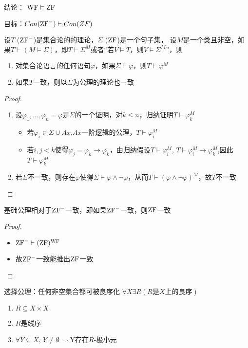 \documentclass[11pt]{article}
\begin{document}
结论： \(\operatorname{WF}\vDash\operatorname{ZF}\)


目标：\(Con(\text{ZF}^-)\vdash Con(ZF)\)

\begin{theorem}[]
设\(T\) (\(\text{ZF}^-\))是集合论的的理论，\(\Sigma\) (\(\operatorname{ZF}\))是一个句子集， 设\(M\)是一个类且非空，如
果\(T\vdash(M\vDash\Sigma)\)，即\(T\vdash\Sigma^M\)或者“若\(V\vDash T\)，则\(V\vDash\Sigma^M\)”，则
\begin{enumerate}
\item 对集合论语言的任何语句\(\varphi\)，如果\(\Sigma\vdash\varphi\)，则\(T\vdash\varphi^M\)
\item 如果\(T\)一致，则以\(\Sigma\)为公理的理论也一致
\end{enumerate}
\end{theorem}

\begin{proof}
\begin{enumerate}
\item 设\(\varphi_1,\dots,\varphi_n=\varphi\)是\(\Sigma\)的一个证明，对\(k\le n\)，归纳证明\(T\vdash\varphi_k^M\)
\begin{itemize}
\item 若\(\varphi_i\in\Sigma\cup Ax\),\(Ax\)一阶逻辑的公理，\(T\vdash\varphi_i^M\)
\item 若\(i,j<k\)使得\(\varphi_j=\varphi_k\to\varphi_k\)，由归纳假设\(T\vdash\varphi_i^M\), \(T\vdash\varphi_i^M\to\varphi_k^M\),因此\(T\vdash\varphi_k^M\)
\end{itemize}
\item 若\(\Sigma\)不一致，则存在\(\varphi\)使得\(\Sigma\vdash\varphi\wedge\neg\varphi\)，从而\(T\vdash(\varphi\wedge\neg\varphi)^M\)，故\(T\)不一致
\end{enumerate}
\end{proof}

\begin{theorem}[]
基础公理相对于\(\text{ZF}^-\)一致，即如果\(\text{ZF}^-\)一致，则\(\operatorname{ZF}\)一致
\end{theorem}

\begin{proof}
\begin{itemize}
\item \(\text{ZF}^-\vdash(\operatorname{ZF})^{\operatorname{WF}}\)
\item 故\(\text{ZF}^-\)一致能推出\(\operatorname{ZF}\)一致
\end{itemize}
\end{proof}

选择公理：任何非空集合都可被良序化
\(\forall X\exists R(R\text{是$X$上的良序})\)
\begin{enumerate}
\item \(R\subseteq X\times X\)
\item \(R\)是线序
\item \(\forall Y\subseteq X\), \(Y\neq\emptyset\Rightarrow\)Y存在\(R\)-极小元
\end{enumerate}
\end{document}
